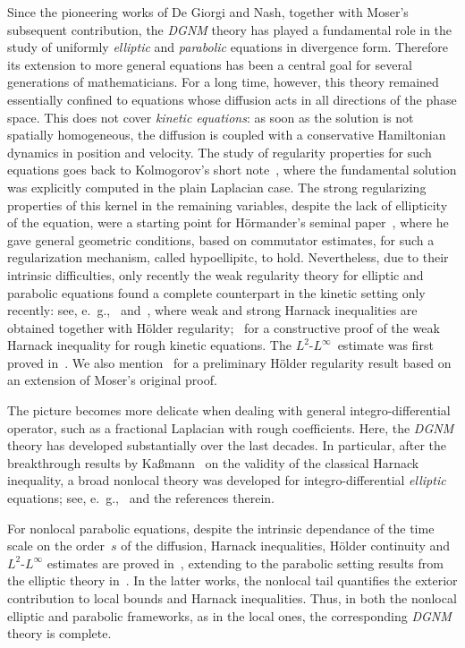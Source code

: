 \documentclass[leqno,10pt]{amsart}
\theoremstyle{plain}
\theoremstyle{remark}
\numberwithin{equation}{section}
\begin{document}
Since the pioneering works of De Giorgi and Nash, together with Moser's subsequent contribution,  the {\it DGNM} theory has played a fundamental role in the study of uniformly {\it elliptic} and {\it parabolic} equations in divergence form. Therefore its extension to more general equations has been a central goal for several generations of mathematicians. For a long time, however, this theory remained essentially confined to equations whose diffusion acts in all directions of the phase space. This does not cover {\it kinetic equations}: as soon as the solution is not spatially homogeneous, the diffusion is coupled with a conservative Hamiltonian dynamics in position and velocity. The study of regularity properties for such equations goes back to Kolmogorov's short note~\cite{Kol34}, where the fundamental solution was explicitly computed in the plain Laplacian case. The strong regularizing properties of this kernel in the remaining variables, despite the lack of ellipticity of the equation, were a starting point for H\"ormander's seminal paper~\cite{Hor67}, where he gave general geometric conditions, based on commutator estimates, for such a regularization mechanism, called hypoellipitc, to hold. Nevertheless, due to their intrinsic difficulties, only recently the weak regularity theory for elliptic and parabolic equations found a complete counterpart in the kinetic setting only recently: see, e.~\!g.,~\cite{GIMV19} and~\cite{GM22,GI23}, where weak and strong Harnack inequalities are obtained together with H\"older regularity;~\cite{DH22} for a constructive proof of the weak Harnack inequality for rough kinetic equations. The $L^2$-$L^\infty$~estimate was first proved in~\cite{PP04}. We also mention~\cite{WZ11} for a preliminary H\"older regularity result based on an extension of Moser's original proof.




\vspace{2mm}

The picture becomes more delicate when dealing with general integro-differential operator, such as a fractional Laplacian with rough coefficients. Here, the {\it DGNM} theory has developed substantially over the last decades. In particular, after the breakthrough results by {Ka{\ss}mann}~\cite{Kas07,Kas11} on the validity of the classical Harnack inequality, a broad nonlocal theory was developed for integro-differential {\it elliptic} equations; see, e.~\!g.,~\cite{Kas09,DKP14,DKP16} and the references therein.

For nonlocal parabolic equations, despite the intrinsic dependance of the  time scale  on the order~$s$ of the diffusion, Harnack inequalities, H\"older continuity and $L^2$-$L^\infty$ estimates are proved in~\cite{KW23}, extending to the parabolic setting results from the elliptic theory in~\cite{DKP14,DKP16}.
In the latter works, the nonlocal tail quantifies the exterior contribution to local bounds and Harnack inequalities. Thus, in both the nonlocal elliptic and parabolic frameworks, as in the local ones, the corresponding {\it DGNM} theory is complete.
\end{document}
